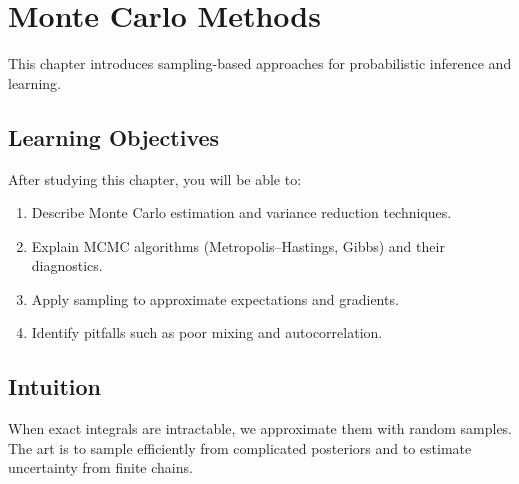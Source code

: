 
\chapter{Monte Carlo Methods}
\label{chap:monte-carlo}

This chapter introduces sampling-based approaches for probabilistic inference and learning.


\section*{Learning Objectives}

After studying this chapter, you will be able to:

\begin{enumerate}
    \item Describe Monte Carlo estimation and variance reduction techniques.
    \item Explain MCMC algorithms (Metropolis–Hastings, Gibbs) and their diagnostics.
    \item Apply sampling to approximate expectations and gradients.
    \item Identify pitfalls such as poor mixing and autocorrelation.
\end{enumerate}


\section*{Intuition}

When exact integrals are intractable, we approximate them with random samples. The art is to sample efficiently from complicated posteriors and to estimate uncertainty from finite chains.












